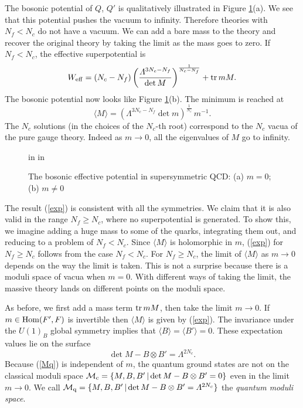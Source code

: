\documentclass[lecture]{qft-l}
\newcommand{\Lam}{\varLambda}
\newcommand{\bef}{\begin{figure}[h]
		\vspace{3ex}}
\newcommand{\enf}{\end{figure}}
\newcommand{\bra}{\langle}
\newcommand{\ket}{\rangle}
\newcommand{\inv}[1]{\frac{1}{#1}}
\newcommand{\set}[2]{\{{#1}\,|\,{#2}\}}
\newcommand{\tr}{{\rm tr}}
\newcommand{\MM}{{\mathcal M}}
\newcommand{\MC}{\MM_{{\rm c}}}
\newcommand{\MQ}{\MM_{{\rm q}}}
\newcommand{\eff}{_{{\rm eff}}}
\newcommand{\Hom}{{\rm Hom}}
\newcommand{\FT}{F'}%
\newcommand{\QT}{Q'}%
\newcommand{\BT}{B'}%
\numberwithin{figure}{chapter}
\begin{document}
The bosonic potential of $Q$, $\QT$ is qualitatively illustrated in 
Figure \ref{Qeff}(a).
We see that this potential pushes the vacuum to infinity.
Therefore theories with $N_f<N_c$ do not have a vacuum.
We can  add a bare mass to the theory and recover the original theory
by taking the limit as the mass goes to zero.
If $N_f<N_c$, the effective superpotential is
	\begin{equation}
W\eff=(N_c-N_f)\left(\frac{\Lam^{3N_c-N_f}}{\det M}\right)^{\inv{N_c-N_f}}
+\tr\,mM.
	\end{equation}
The bosonic potential now looks like Figure \ref{Qeff}(b).
The minimum is reached at 
	\begin{equation}\label{exp}
\bra M\ket=(\Lam^{3N_c-N_f}\det m)^{\inv{N_c}}\,m^{-1}.
	\end{equation}
The $N_c$ solutions (in the choices of the $N_c$-th root) correspond
to the $N_c$ vacua of the pure gauge theory.
Indeed as $m\to0$, all the eigenvalues of $M$ go to infinity.

	\bef
{} in
 in
\centerline{}
\caption{\protect\label{Qeff}The bosonic effective potential 
in supersymmetric QCD: (a) $m=0$; (b) $m\ne0$}
	\enf

The result (\ref{exp}) is consistent with all the symmetries. 
We claim that it is also valid in the range $N_f\ge N_c$, where no
superpotential is generated.
To show this, we imagine adding a huge mass to some of the quarks,
integrating them out, and reducing to a problem of $N_f<N_c$.
Since $\bra M\ket$ is holomorphic in $m$, (\ref{exp}) for $N_f\ge N_c$
follows from the case $N_f<N_c$.
For $N_f\ge N_c$, the limit of $\bra M\ket$ as $m\to0$ depends on the way
the limit is taken.
This is not a surprise because there is a moduli space of vacua when $m=0$.
With different ways of taking the limit, the massive theory lands on
different points on the moduli space.


As before, we first add a mass term $\tr\,mM$, then take the limit $m\to0$.
If $m\in\Hom(\FT,F)$ is invertible then $\bra M\ket$ is given by (\ref{exp}).
The invariance under the $U(1)_B$ global symmetry implies that
$\bra B\ket=\bra\BT\ket=0$.
These expectation values lie on the surface
	\begin{equation}\label{Mq}
\det M-B\otimes\BT=\Lam^{2N_c}.	
	\end{equation}
Because (\ref{Mq}) is independent of $m$, the quantum ground states are
not on the classical moduli space $\MC=\set{M,B,\BT}{\det M-B\otimes\BT=0}$
even in the limit $m\to0$.
We call $\MQ=\set{M,B,\BT}{\det M-B\otimes\BT=\Lam^{2N_c}}$
the {\em quantum moduli space}.
\end{document}
